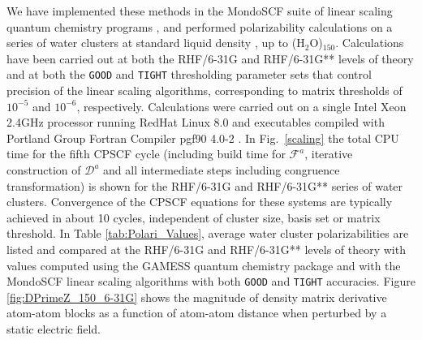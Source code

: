 \documentclass[prl,aps,twocolumn,showpacs,twocolumngrid,superbib]{revtex4}
\begin{document}
We have implemented these methods in the {\sc MondoSCF} suite of linear scaling quantum chemistry programs \cite{MondoSCF},
and performed polarizability calculations on a series of water clusters at standard liquid density \cite{Water}, 
up to (H$_2$O)$_{150}$. Calculations have been carried out at both the RHF/6-31G and RHF/6-31G** levels of 
theory and at both the {\tt GOOD} and {\tt TIGHT} thresholding parameter sets that control precision of the 
linear scaling algorithms, corresponding to matrix thresholds of $10^{-5}$ and $10^{-6}$, respectively.  
Calculations were carried out on a single Intel Xeon 2.4GHz processor running RedHat Linux 8.0 and  executables compiled 
with Portland Group Fortran Compiler pgf90 4.0-2 \cite{PGF90}. In Fig.~\ref{scaling} the 
total CPU time for the fifth CPSCF cycle (including build time for $\mathcal{F}^a$, 
iterative construction of $\mathcal{D}^a$ and all intermediate 
steps including congruence transformation) is shown for the RHF/6-31G and RHF/6-31G** series 
of water clusters.  Convergence of the CPSCF equations for these systems are typically 
achieved in about 10 cycles, independent of cluster size, basis set or matrix threshold.  
In Table \ref{tab:Polari_Values},  average water cluster  polarizabilities are listed and compared at the RHF/6-31G 
and RHF/6-31G** levels of theory with values computed using the {\sc GAMESS} quantum chemistry package \cite{gamess} and 
with the {\sc MondoSCF} linear scaling algorithms with both {\tt GOOD} and {\tt TIGHT} accuracies.  
Figure \ref{fig:DPrimeZ_150_6-31G} shows the magnitude of density matrix derivative atom-atom blocks as a function of 
atom-atom distance when perturbed by a static electric field.
\end{document}
